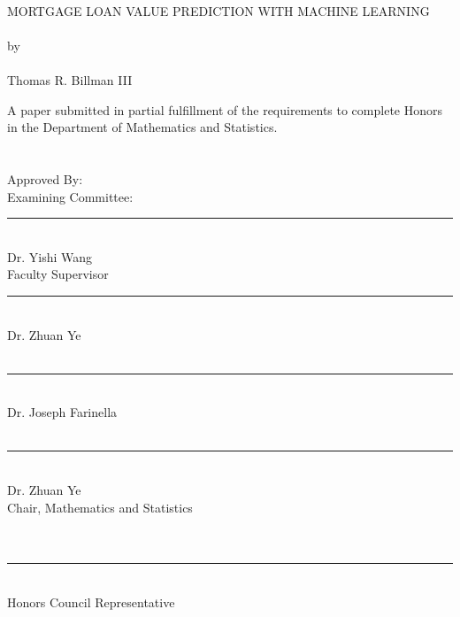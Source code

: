 \documentclass[12 pt]{uncw_thesis}
\theoremstyle{plain}
\theoremstyle{remark}
\theoremstyle{definition}
\begin{document}
%
%
\pagestyle{empty}
\begin{singlespace}
\begin{center}
     \hskip 1pt \\    %
     {\large MORTGAGE LOAN VALUE PREDICTION WITH MACHINE LEARNING}\\
     \hskip 1pt \\
     by \\
     \hskip 1pt \\    %
     Thomas R. Billman III
\end{center} %
     A paper submitted in partial fulfillment of the requirements to complete Honors in
     the Department of Mathematics and Statistics. \\
     \hskip 1pt \\
     \hskip 1pt \\
\hspace*{3.25in} Approved By: \\
Examining Committee: \\ 
\hspace*{3.25in} \rule{6.5cm}{.01in}\\ %
\hspace*{3.25in} Dr. Yishi Wang \\ 
\hspace*{3.25in} Faculty Supervisor \\ 
\rule{7.5cm}{.01in}\\
Dr. Zhuan Ye \\ 
\\ 
\rule{7.5cm}{.01in}\\ 
Dr. Joseph Farinella \\ 
\\
\hspace*{3.25in} \rule{6.5cm}{.01in}\\ %
    \hspace*{3.25in} Dr. Zhuan Ye \\
    \hspace*{3.25in} Chair, Mathematics and Statistics \\ 
    \\
    \\
    \rule{7.5cm}{.01in}\\
     Honors Council Representative \\
    \\ 
    \\

\end{singlespace}
\end{document}
